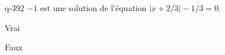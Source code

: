 \begin{truefalse}{q-392}
$-1$ est une solution de l'équation $|x+2/3|-1/3=0$.
\item* Vrai
\item Faux
\end{truefalse}

